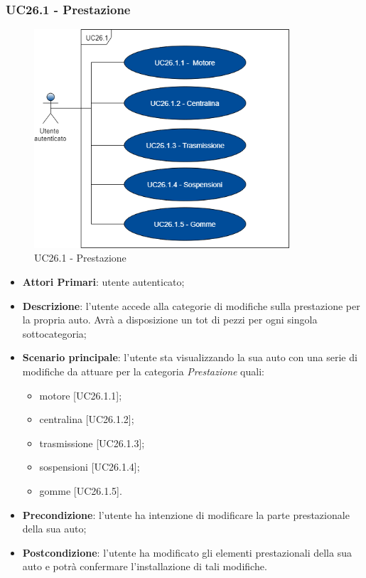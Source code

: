 \subsubsection{UC26.1 - Prestazione}
\begin{figure}[h]
	\includegraphics[width=9.5cm]{res/images/UC26-1Prestazioni.png}
	\centering
	\caption{UC26.1 - Prestazione}
\end{figure}
\begin{itemize}
	\item \textbf{Attori Primari}: utente autenticato;
	\item \textbf{Descrizione}: l'utente accede alla categorie di modifiche sulla prestazione per la propria auto. Avrà a disposizione un tot di pezzi per ogni singola sottocategoria;
	\item \textbf{Scenario principale}: l'utente sta visualizzando la sua auto con una serie di modifiche da attuare per la categoria \textit{Prestazione} quali:
	\begin{itemize}
		\item motore [UC26.1.1];
		\item centralina [UC26.1.2];
		\item trasmissione [UC26.1.3];
		\item sospensioni [UC26.1.4];
		\item gomme [UC26.1.5].
	\end{itemize}
	\item \textbf{Precondizione}: l'utente ha intenzione di modificare la parte prestazionale della sua auto;
	\item \textbf{Postcondizione}: l'utente ha modificato gli elementi prestazionali della sua auto e potrà confermare l'installazione di tali modifiche.
\end{itemize}
